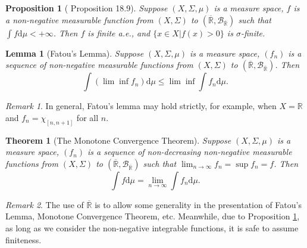 \documentclass[openany]{book}
\newtheorem{lemma}{Lemma}[chapter]
\newtheorem{proposition}{Proposition}[chapter]
\newtheorem{theorem}{Theorem}[chapter]
\theoremstyle{definition}
\theoremstyle{remark}
\newtheorem*{remark}{Remark}
\begin{document}
\begin{proposition}[\cite{RF88} Proposition 18.9]\label{prop:inftyZeroMeasure}
    Suppose $(X,\Sigma,\mu)$ is a measure space, $f$ is a non-negative measurable function from $(X,\Sigma)$ to $(\overline{\mathbb{R}},\mathcal{B}_{\overline{\mathbb{R}}})$ such that $\int f \mathrm{d}\mu<+\infty$. Then $f$ is finite a.e., and $\{x\in X|f(x)>0\}$ is $\sigma$-finite.
\end{proposition}
\begin{lemma}[Fatou's Lemma]
    Suppose $(X,\Sigma,\mu)$ is a measure space, $(f_n)$ is a sequence of non-negative measurable functions from $(X,\Sigma)$ to $(\overline{\mathbb{R}},\mathcal{B}_{\overline{\mathbb{R}}})$. Then
    \begin{equation*}
        \int\left(\lim\inf f_n\right)\mathrm{d}\mu\le\lim\inf\int f_n \mathrm{d}\mu.
    \end{equation*}
\end{lemma}
\begin{remark}
    In general, Fatou's lemma may hold strictly, for example, when $X=\mathbb{R}$ and $f_n=\chi_{[n,n+1]}$ for all $n$.
\end{remark}
\begin{theorem}[The Monotone Convergence Theorem]
    Suppose $(X,\Sigma,\mu)$ is a measure space, $(f_n)$ is a sequence of non-decreasing non-negative measurable functions from $(X,\Sigma)$ to $(\overline{\mathbb{R}},\mathcal{B}_{\overline{\mathbb{R}}})$ such that $\lim_{n\to\infty}f_n=\sup f_n=f$. Then
    \begin{equation*}
        \int f \mathrm{d}\mu=\lim_{n\to\infty}\int f_n \mathrm{d}\mu.
    \end{equation*}
\end{theorem}
\begin{remark}
    The use of $\overline{\mathbb{R}}$ is to allow some generality in the presentation of Fatou's Lemma, Monotone Convergence Theorem, etc. Meanwhile, due to Proposition \ref{prop:inftyZeroMeasure}, as long as we consider the non-negative integrable functions, it is safe to assume finiteness.
\end{remark}
\end{document}
